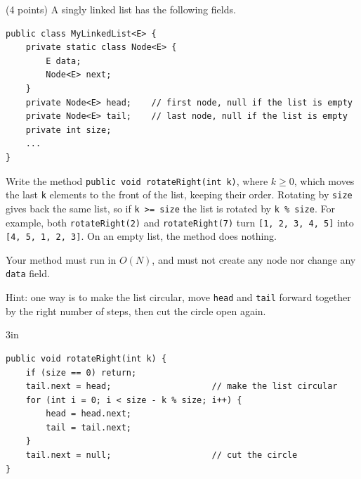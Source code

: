 \begin{question}
(4 points) A singly linked list has the following fields.

\begin{lstlisting}
public class MyLinkedList<E> {
    private static class Node<E> {
        E data;
        Node<E> next;
    }
    private Node<E> head;    // first node, null if the list is empty
    private Node<E> tail;    // last node, null if the list is empty
    private int size;
    ...
}
\end{lstlisting}

Write the method \lstinline|public void rotateRight(int k)|, where $k \ge 0$, which moves the last \lstinline|k| elements to the front of the list, keeping their order.
Rotating by \lstinline|size| gives back the same list, so if \lstinline|k >= size| the list is rotated by \lstinline|k % size|.
For example, both \lstinline|rotateRight(2)| and \lstinline|rotateRight(7)| turn \lstinline|[1, 2, 3, 4, 5]| into \lstinline|[4, 5, 1, 2, 3]|.
On an empty list, the method does nothing.

Your method must run in $O(N)$, and must not create any node nor change any \lstinline|data| field.

Hint: one way is to make the list circular, move \lstinline|head| and \lstinline|tail| forward together by the right number of steps, then cut the circle open again.

\begin{answerspace}{3in}
\ifanswers
\begin{lstlisting}
public void rotateRight(int k) {
    if (size == 0) return;
    tail.next = head;                    // make the list circular
    for (int i = 0; i < size - k % size; i++) {
        head = head.next;
        tail = tail.next;
    }
    tail.next = null;                    // cut the circle
}
\end{lstlisting}
\fi
\end{answerspace}
\end{question}
